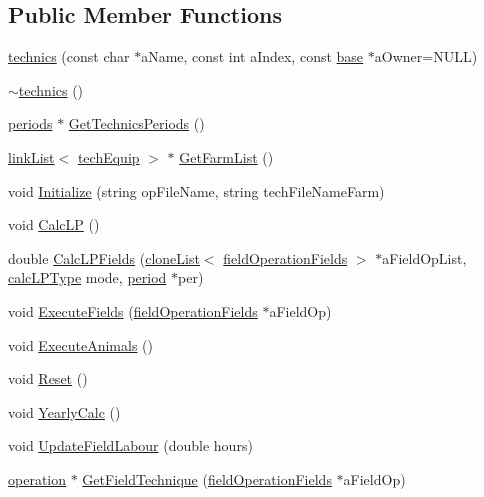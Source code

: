 \subsection*{Public Member Functions}
\begin{DoxyCompactItemize}
\item 
\hyperlink{classtechnics_a47b746b0d44d885fe95cadf0f4e7c0a1}{technics} (const char $\ast$aName, const int aIndex, const \hyperlink{classbase}{base} $\ast$aOwner=NULL)
\item 
\hyperlink{classtechnics_a82e253113692a5bec7627f9b20f4b943}{$\sim$technics} ()
\item 
\hyperlink{classperiods}{periods} $\ast$ \hyperlink{classtechnics_a9c1e0dbe77fc4d0b0e5574a3a4bcc036}{GetTechnicsPeriods} ()
\item 
\hyperlink{classlink_list}{linkList}$<$ \hyperlink{classtech_equip}{techEquip} $>$ $\ast$ \hyperlink{classtechnics_ad2b4807ba763ac388ab4d6c234924824}{GetFarmList} ()
\item 
void \hyperlink{classtechnics_ac3119cfc01ae6232db8bbd5b0d0b3167}{Initialize} (string opFileName, string techFileNameFarm)
\item 
void \hyperlink{classtechnics_a2eb11f92d4788a35a493d238b1c2dab5}{CalcLP} ()
\item 
double \hyperlink{classtechnics_a3df73c58483ecfca1efdccc7e296bc20}{CalcLPFields} (\hyperlink{classclone_list}{cloneList}$<$ \hyperlink{classfield_operation_fields}{fieldOperationFields} $>$ $\ast$aFieldOpList, \hyperlink{typer_8h_af05cf854fc14086a0d6404be5ae9813f}{calcLPType} mode, \hyperlink{classperiod}{period} $\ast$per)
\item 
void \hyperlink{classtechnics_ae0675e9047b1367a29954b723afb2494}{ExecuteFields} (\hyperlink{classfield_operation_fields}{fieldOperationFields} $\ast$aFieldOp)
\item 
void \hyperlink{classtechnics_a881455e5f5a830ccc89f53df17f6fc78}{ExecuteAnimals} ()
\item 
void \hyperlink{classtechnics_a14c35cb20c7f722efbc95b314f63ad19}{Reset} ()
\item 
void \hyperlink{classtechnics_ab3e5249c76b64203b756a9f561a9d4e4}{YearlyCalc} ()
\item 
void \hyperlink{classtechnics_a6ea8c7844295bb257bfefdea2d9987de}{UpdateFieldLabour} (double hours)
\item 
\hyperlink{classoperation}{operation} $\ast$ \hyperlink{classtechnics_a5d57f2ddaeab8b58d29541bf99918434}{GetFieldTechnique} (\hyperlink{classfield_operation_fields}{fieldOperationFields} $\ast$aFieldOp)
\end{DoxyCompactItemize}


